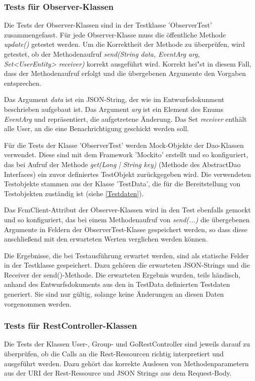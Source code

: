 \documentclass[11pt,a4paper]{scrartcl}
\begin{document}
\subsubsection{Tests für Observer-Klassen}
Die Tests der Observer-Klassen sind in der Testklasse 'ObserverTest' zusammengefasst. Für jede Observer-Klasse muss die öffentliche Methode \textit{update()} getestet werden.
Um die Korrektheit der Methode zu überprüfen, wird getestet, ob der Methodenaufruf \textit{send(String data, EventArg arg, Set<UserEntity> receiver)} korrekt ausgeführt wird. Korrekt hei"st in diesem Fall, dass der Methodenaufruf erfolgt und die übergebenen Argumente den Vorgaben entsprechen.

Das Argument \textit{data} ist ein JSON-String, der wie im Entwurfsdokunment beschrieben aufgebaut ist. Das Argument \textit{arg} ist ein Element des Enums \textit{EventArg} und repräsentiert, die aufgetretene Änderung. Das Set \textit{receiver} enthält alle User, an die eine Benachrichtigung geschickt werden soll.

Für die Tests der Klasse 'ObserverTest' werden Mock-Objekte der Dao-Klassen verwendet. Diese sind mit dem Framework 'Mockito' erstellt und so konfiguriert, das bei Aufruf der Methode \textit{get({Long | String} key)} (Methode des AbstractDao Interfaces) ein zuvor definiertes TestObjekt zurückgegeben wird. Die verwendeten Testobjekte stammen aus der Klasse 'TestData', die für die Bereitstellung von Testobjekten zuständig ist (siehe \ref{Testdaten}).

Das FcmClient-Attribut der Observer-Klassen wird in den Test ebenfalls gemockt und so konfiguriert, das bei einem Methodenaufruf von \textit{send(...)} die übergebenen Argumente in Feldern der ObserverTest-Klasse gespeichert werden, so dass diese anschließend mit den erwarteten Werten verglichen werden können.

Die Ergebnisse, die bei Testausführung erwartet werden, sind als statische Felder in der Testklasse gespeichert. Dazu gehören die erwarteten JSON-Strings und die Receiver der send()-Methode.
Die erwarteten Ergebnis wurden, teils händisch, anhand des Entwurfsdokuments aus den in TestData definierten Testdaten generiert. Sie sind nur gültig, solange keine Änderungen an diesen Daten vorgenommen werden.

\subsubsection{Tests für RestController-Klassen}
Die Tests der Klassen User-, Group- und GoRestController sind jeweils darauf zu überprüfen, ob die Calls an die Rest-Ressourcen richtig interpretiert und ausgeführt werden. Dazu gehört das korrekte Auslesen von Methodenparametern aus der URI der Rest-Ressource und JSON Strings aus dem Request-Body.
\end{document}
